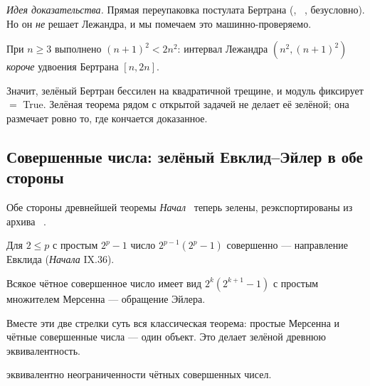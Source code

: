 \emph{Идея доказательства.} Прямая переупаковка постулата Бертрана
(, ~\cite{mathlib}, безусловно). Но он
\emph{не} решает Лежандра, и мы помечаем это машинно-проверяемо.

\begin{theorem}\label{thm:legendre_interval_shorter_than_bertrand}
\green{}\; При $n\ge3$ выполнено $(n+1)^2<2n^2$: интервал Лежандра $(n^2,(n+1)^2)$ \emph{короче}
удвоения Бертрана $[n,2n]$.
\end{theorem}

Значит, зелёный Бертран бессилен на квадратичной трещине, и модуль фиксирует
 $=$ True. Зелёная теорема рядом с открытой задачей не
делает её зелёной; она размечает ровно то, где кончается доказанное.

\subsection{Совершенные числа: зелёный Евклид--Эйлер в обе стороны}

Обе стороны древнейшей теоремы \emph{Начал}~\cite{euclid-elements} теперь зелены, реэкспортированы из
архива ~\cite{mathlib,wiedijk100}.

\begin{theorem}\label{thm:perfect_of_mersennePrime}
\green{}\; Для $2\le p$ с простым $2^p-1$ число $2^{p-1}(2^p-1)$ совершенно --- направление Евклида
(\emph{Начала} IX.36).
\end{theorem}

\begin{theorem}\label{thm:evenPerfect_eq}
\green{}\; Всякое чётное совершенное число имеет вид $2^k(2^{k+1}-1)$ с простым множителем Мерсенна
--- обращение Эйлера.
\end{theorem}

Вместе эти две стрелки суть вся классическая теорема: простые Мерсенна и чётные совершенные числа ---
один объект. Это делает зелёной древнюю эквивалентность.

\begin{theorem}\label{thm:mersennePrimesInfinite_iff_evenPerfectUnbounded}
\green{}\;  эквивалентно неограниченности чётных совершенных чисел.
\end{theorem}

